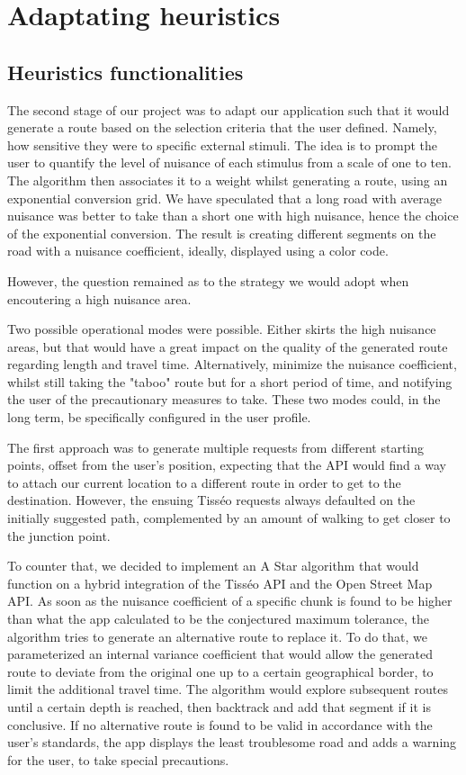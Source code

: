 \section{Adaptating heuristics}


\subsection{Heuristics functionalities}


The second stage of our project was to adapt our application such that it would generate a route based on the selection criteria that the user defined. Namely, how sensitive they were to specific external stimuli. The idea is to prompt the user to quantify the level of nuisance of each stimulus from a scale of one to ten. The algorithm then associates it to a weight whilst generating a route, using an exponential conversion grid. We have speculated that a long road with average nuisance was better to take than a short one with high nuisance, hence the choice of the exponential conversion. The result is creating different segments on the road with a nuisance coefficient, ideally, displayed using a color code.


However, the question remained as to the strategy we would adopt when encoutering a high nuisance area.


Two possible operational modes were possible. Either skirts the high nuisance areas, but that would have a great impact on the quality of the generated route regarding length and travel time. Alternatively, minimize the nuisance coefficient, whilst still taking the "taboo" route but for a short period of time, and notifying the user of the precautionary measures to take. These two modes could, in the long term, be specifically configured in the user profile.


The first approach was to generate multiple requests from different starting points, offset from the user's position, expecting that the API would find a way to attach our current location to a different route in order to get to the destination. However, the ensuing Tisséo requests always defaulted on the initially suggested path, complemented by an amount of walking to get closer to the junction point.


To counter that, we decided to implement an A Star algorithm that would function on a hybrid integration of the Tisséo API and the Open Street Map API. As soon as the nuisance coefficient of a specific chunk is found to be higher than what the app calculated to be the conjectured maximum tolerance, the algorithm tries to generate an alternative route to replace it. To do that, we parameterized an internal variance coefficient that would allow the generated route to deviate from the original one up to a certain geographical border, to limit the additional travel time. The algorithm would explore subsequent routes until a certain depth is reached, then backtrack and add that segment if it is conclusive. If no alternative route is found to be valid in accordance with the user's standards, the app displays the least troublesome road and adds a warning for the user, to take special precautions.



